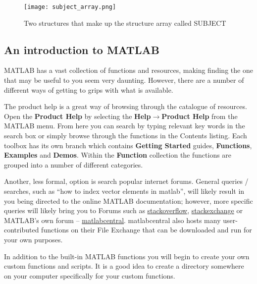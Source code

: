 \documentclass[12pt,a4paper]{article}
\begin{document}
{\begin{figure}[H]
\begin{center}
\texttt{[image: subject\_array.png]}
\caption{Two structures that make up the structure array called SUBJECT}
\label{fig:structurearray}
\end{center}
\end{figure}

\subsection{An introduction to MATLAB}
MATLAB has a vast collection of functions and resources, making finding the one that may be useful to you seem very daunting.  
However, there are a number of different ways of getting to grips with what is available.

The product help is a great way of browsing through the catalogue of resources.  
Open the \textbf{Product Help} by selecting the \textbf{Help}$\rightarrow$\textbf{Product Help} from the MATLAB menu.  
From here you can search by typing relevant key words in the search box or simply browse through the functions in the Contents listing.  
Each toolbox has its own branch which contains \textbf{Getting Started} guides, \textbf{Functions}, \textbf{Examples} and \textbf{Demos}.  
Within the \textbf{Function} collection the functions are grouped into a number of different categories.

Another, less formal, option is search popular internet forums. 
General queries / searches, such as ``how to index vector elements in matlab'', will likely result in you being directed to the online MATLAB documentation; however, more specific queries will likely bring you to Forums such as \href{https://stackoverflow.com/}{stackoverflow}, \href{https://stackexchange.com/}{stackexchange} or MATLAB's own forum – \href{https://au.mathworks.com/matlabcentral/}{matlabcentral}.
matlabcentral also hosts many user-contributed functions on their File Exchange that can be downloaded and run for your own purposes.

In addition to the built-in MATLAB functions you will begin to create your own custom functions and scripts.  
It is a good idea to create a directory somewhere on your computer specifically for your custom functions.

}
\end{document}
